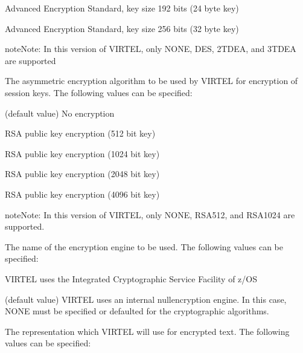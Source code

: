 \documentclass[letterpaper,10pt,english]{sphinxmanual}
\begin{document}
\sphinxAtStartPar
{} \sphinxhyphen{} Advanced Encryption Standard, key size 192 bits (24 byte key)

\sphinxAtStartPar
{} \sphinxhyphen{} Advanced Encryption Standard, key size 256 bits (32 byte key)

\begin{sphinxadmonition}{note}{Note:}
\sphinxAtStartPar
In this version of VIRTEL, only NONE, DES, 2TDEA, and 3TDEA are supported
\end{sphinxadmonition}

\sphinxAtStartPar
{} \sphinxhyphen{} The asymmetric encryption algorithm to be used by VIRTEL for encryption of session keys. The following values can be specified:

\sphinxAtStartPar
{} \sphinxhyphen{} (default value) No encryption

\sphinxAtStartPar
{} \sphinxhyphen{} RSA public key encryption (512 bit key)

\sphinxAtStartPar
{} \sphinxhyphen{} RSA public key encryption (1024 bit key)

\sphinxAtStartPar
{} \sphinxhyphen{} RSA public key encryption (2048 bit key)

\sphinxAtStartPar
{} \sphinxhyphen{} RSA public key encryption (4096 bit key)

\begin{sphinxadmonition}{note}{Note:}
\sphinxAtStartPar
In this version of VIRTEL, only NONE, RSA\sphinxhyphen{}512, and RSA\sphinxhyphen{}1024 are supported.
\end{sphinxadmonition}

\sphinxAtStartPar
{} \sphinxhyphen{} The name of the encryption engine to be used. The following values can be specified:

\sphinxAtStartPar
{} \sphinxhyphen{} VIRTEL uses the Integrated Cryptographic Service Facility of z/OS

\sphinxAtStartPar
{} \sphinxhyphen{} (default value) VIRTEL uses an internal null\sphinxhyphen{}encryption engine. In this case, NONE must be specified or defaulted for the cryptographic algorithms.

\sphinxAtStartPar
{} \sphinxhyphen{} The representation which VIRTEL will use for encrypted text. The following values can be specified:
\end{document}
